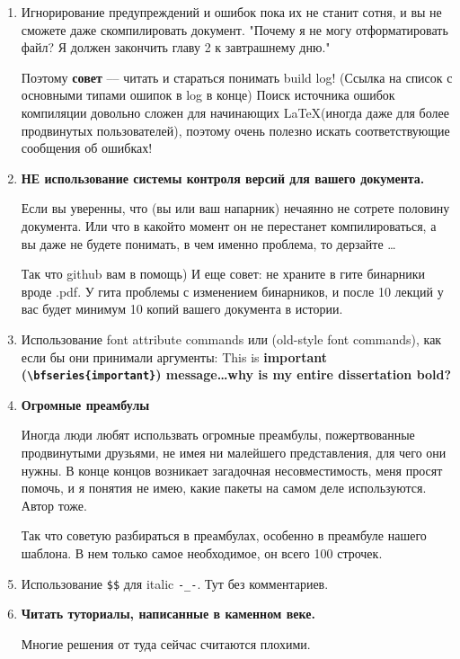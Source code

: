 \begin{enumerate}
	\item Игнорирование предупреждений и ошибок пока их не станит сотня, и вы не сможете даже скомпилировать документ. "Почему я не могу отформатировать файл? Я должен закончить главу 2 к завтрашнему дню."
	
	Поэтому  \textbf{совет} –– читать и стараться понимать build log! (Ссылка на список с основными типами ошипок в log в конце)
	Поиск источника ошибок компиляции довольно сложен для начинающих \LaTeX (иногда даже для более продвинутых пользователей), поэтому очень полезно искать соответствующие сообщения об ошибках!
	
	\item \textbf{НЕ использование системы контроля версий для вашего документа.}
	
	Если вы уверенны, что (вы или ваш напарник) нечаянно не сотрете половину документа. 
	Или что в какойто момент он не перестанет компилироваться, а вы даже не будете понимать, в чем именно проблема, то дерзайте \ldots 
	
	Так что github вам в помощь) И еще совет: не храните в гите бинарники вроде .pdf. У гита проблемы с изменением бинарников, и после 10 лекций у вас будет минимум 10 копий вашего документа в истории. 
	
	\item Использование font attribute commands или (old-style font commands), как если бы они принимали аргументы: This is {\bfseries{important} (\verb|\bfseries{important}|) message\ldots why is my entire dissertation bold?}
	
	\item \textbf{Огромные преамбулы}
	
	Иногда люди любят использвать огромные преамбулы, пожертвованные продвинутыми друзьями, не имея ни малейшего представления, для чего они нужны. В конце концов возникает загадочная несовместимость, меня просят помочь, и я понятия не имею, какие пакеты на самом деле используются. Автор тоже.
	
	Так что советую разбираться в преамбулах, особенно в преамбуле нашего шаблона. В нем только самое необходимое, он всего 100 строчек.
	
	\item Использование \verb|$$| для italic \verb|-_-|.  Тут без комментариев.
	
	\item \textbf{Читать туториалы, написанные в каменном веке.}
	
	Многие решения от туда сейчас считаются плохими.
	
\end{enumerate}                         
